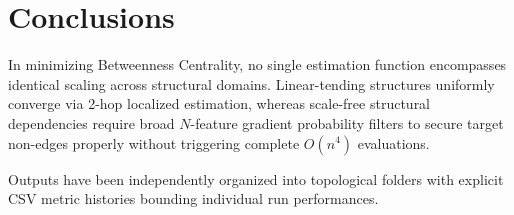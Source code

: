 \documentclass[11pt]{article}
\begin{document}
\section{Conclusions}
In minimizing Betweenness Centrality, no single estimation function encompasses identical scaling across structural domains. Linear-tending structures uniformly converge via 2-hop localized estimation, whereas scale-free structural dependencies require broad $N$-feature gradient probability filters to secure target non-edges properly without triggering complete $O(n^4)$ evaluations.

Outputs have been independently organized into topological folders with explicit CSV metric histories bounding individual run performances.
\end{document}
